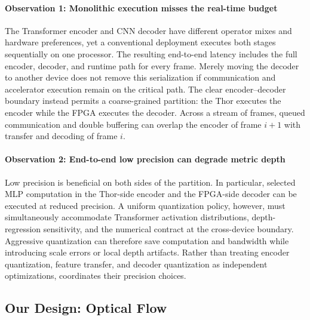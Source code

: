 \paragraph{Observation 1: Monolithic execution misses the real-time budget}
The Transformer encoder and CNN decoder have different operator mixes and
hardware preferences, yet a conventional deployment executes both stages
sequentially on one processor.  The resulting end-to-end latency includes the
full encoder, decoder, and runtime path for every frame.  Merely moving the
decoder to another device does not remove this serialization if communication
and accelerator execution remain on the critical path.  The clear
encoder--decoder boundary instead permits a coarse-grained partition: the Thor
executes the encoder while the FPGA executes the decoder.  Across a stream of
frames, queued communication and double buffering can overlap the encoder of
frame $i+1$ with transfer and decoding of frame $i$.

\begin{table}[t]
  \caption{Observation table. \pending}
  \label{tab:obs}
  \centering
\end{table}

\paragraph{Observation 2: End-to-end low precision can degrade metric depth}
Low precision is beneficial on both sides of the partition.  In particular,
selected MLP computation in the Thor-side encoder and the FPGA-side decoder
can be executed at reduced precision.  A uniform quantization policy, however,
must simultaneously accommodate Transformer activation distributions,
depth-regression sensitivity, and the numerical contract at the cross-device
boundary.  Aggressive quantization can therefore save computation and
bandwidth while introducing scale errors or local depth artifacts.  Rather than
treating encoder quantization, feature transfer, and decoder quantization as
independent optimizations, \system{} coordinates their precision choices.

\subsection{Our Design: Optical Flow}
\label{sec:optical-flow}


